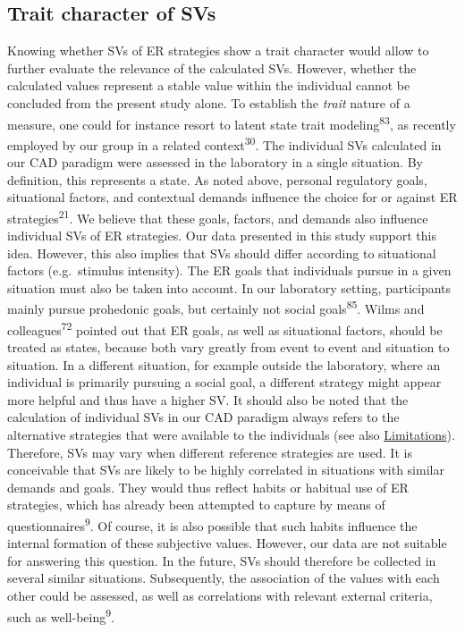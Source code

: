 \documentclass[
  man,floatsintext]{apa6}
\begin{document}
\hypertarget{trait-character-of-svs}{%
\subsection{Trait character of SVs}\label{trait-character-of-svs}}

Knowing whether SVs of ER strategies show a trait character would allow to further evaluate the relevance of the calculated SVs.
However, whether the calculated values represent a stable value within the individual cannot be concluded from the present study alone.
To establish the \emph{trait} nature of a measure, one could for instance resort to latent state trait modeling\textsuperscript{83}, as recently employed by our group in a related context\textsuperscript{30}.
The individual SVs calculated in our CAD paradigm were assessed in the laboratory in a single situation.
By definition, this represents a state.
As noted above, personal regulatory goals, situational factors, and contextual demands influence the choice for or against ER strategies\textsuperscript{21}.
We believe that these goals, factors, and demands also influence individual SVs of ER strategies.
Our data presented in this study support this idea.
However, this also implies that SVs should differ according to situational factors (e.g.~stimulus intensity).
The ER goals that individuals pursue in a given situation must also be taken into account.
In our laboratory setting, participants mainly pursue prohedonic goals, but certainly not social goals\textsuperscript{85}.
Wilms and colleagues\textsuperscript{72} pointed out that ER goals, as well as situational factors, should be treated as states, because both vary greatly from event to event and situation to situation.
In a different situation, for example outside the laboratory, where an individual is primarily pursuing a social goal, a different strategy might appear more helpful and thus have a higher SV.
It should also be noted that the calculation of individual SVs in our CAD paradigm always refers to the alternative strategies that were available to the individuals (see also \protect\hyperlink{Limitations}{Limitations}).
Therefore, SVs may vary when different reference strategies are used.
It is conceivable that SVs are likely to be highly correlated in situations with similar demands and goals.
They would thus reflect habits or habitual use of ER strategies, which has already been attempted to capture by means of questionnaires\textsuperscript{9}.
Of course, it is also possible that such habits influence the internal formation of these subjective values.
However, our data are not suitable for answering this question.
In the future, SVs should therefore be collected in several similar situations.
Subsequently, the association of the values with each other could be assessed, as well as correlations with relevant external criteria, such as well-being\textsuperscript{9}.
\end{document}
